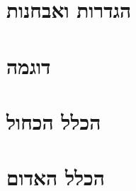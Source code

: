 \documentclass[]{article}
\def\insert#1{}
\begin{document}
\def\lecnum{4}
\def\topcis{
עץ פורש מינימלי
}

\section*{הגדרות ואבחנות}
\insert{preliminary}
\section*{דוגמה}
\insert{example}
\section*{הכלל הכחול}
\insert{blue}
\section*{הכלל האדום}
\insert{red}
\end{document}
